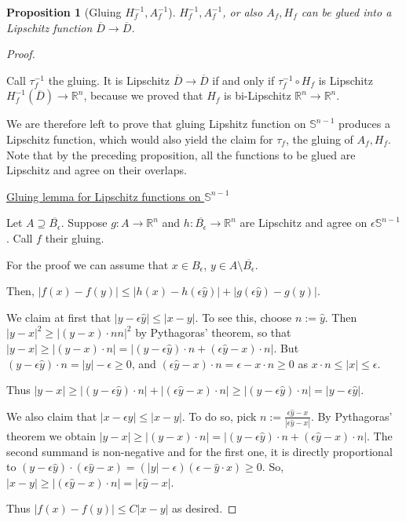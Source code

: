 \documentclass[english,a4paper,12pt,oneside]{scrbook}
\theoremstyle{break}
\newtheorem{prop}[equation]{Proposition}
\newenvironment{mproof}[1][\proofname]{%
  \begin{proof}[#1]$ $\par\nobreak\ignorespaces
}{%
  \end{proof}
}
\renewcommand*{\proofname}{Proof}
\theoremstyle{remark}
\newcommand{\mR}{\mathbb{R}}
\newcommand{\mS}{\mathbb{S}^{n-1}}
\newcommand{\yh}{\hat{y}}
\newcommand{\eps}{\epsilon}
\begin{document}
\begin{prop}[Gluing $H_f^{-1}, A_f^{-1}$]
\label{prop:gluing}
$H_f^{-1}, A_f^{-1}$, or also $A_f, H_f$ can be glued into a Lipschitz function $\overline{D}\rightarrow\overline{D}$.
\end{prop}
\begin{mproof}

Call $\tau_f^{-1}$ the gluing. It is Lipschitz $\overline{D}\rightarrow\overline{D}$ if and only if $\tau_f^{-1}\circ H_f$ is Lipschitz $H_f^{-1}(\overline{D})\rightarrow\mR^n$, because we proved that $H_f$ is bi-Lipschitz $\mR^n \rightarrow \mR^n$.

We are therefore left to prove that gluing Lipshitz function on $\mS$ produces a Lipschitz function, which would also yield the claim for $\tau_f$, the gluing of $A_f, H_f$. Note that by the preceding proposition, all the functions to be glued are Lipschitz and agree on their overlaps.

\underline{Gluing lemma for Lipschitz functions on $\mS$}

Let $A\supseteq \overline{B_\eps}$. Suppose $g:A\rightarrow\mR^n$ and $h:\overline{B_\eps}\rightarrow\mR^n$ are Lipschitz and agree on $\eps \mS$. Call $f$ their gluing.

For the proof we can assume that $x \in B_\eps$, $y \in A \setminus \overline{B_\eps}$.

Then, $|f(x)-f(y)|\leq |h(x)-h(\eps \yh)|+|g(\eps \yh)-g(y)|$.

We claim at first that $|y-\eps \yh|\leq  |x-y|$. To see this, choose $n:=\yh$. Then $|y-x|^2 \geq |(y-x)\cdot n n|^2$ by Pythagoras' theorem, so that $|y-x|\geq |(y-x)\cdot n| = |(y-\eps \yh)\cdot n + (\eps \yh -x)\cdot n|$. But $(y-\eps \yh)\cdot n=|y|-\eps \geq 0$, and $(\eps \yh -x)\cdot n = \eps - x\cdot n\geq 0 $ as $x\cdot n \leq |x|\leq \eps$.

Thus  $|y-x|\geq |(y-\eps \yh)\cdot n| + |(\eps \yh -x)\cdot n|\geq  |(y-\eps \yh)\cdot n|=|y-\eps \yh|$.

We also claim that $|x-\eps \yh|\leq |x-y|$. To do so, pick $n:=\frac{\eps\yh -x}{|\eps\yh-x|}$. By Pythagoras' theorem we obtain $|y-x|\geq |(y-x)\cdot n|=|(y-\eps \yh)\cdot n +(\eps \yh -x)\cdot n|$. The second summand is non-negative and for the first one, it is directly proportional to $(y-\eps \yh)\cdot(\eps \yh-x)=(|y|-\eps)(\eps-\yh\cdot x)\geq 0$. So, $|x-y|\geq |(\eps \yh -x)\cdot n|=|\eps \yh -x|$.

Thus $ |f(x)-f(y)|\leq C|x-y|$ as desired.


\end{mproof}
\end{document}
